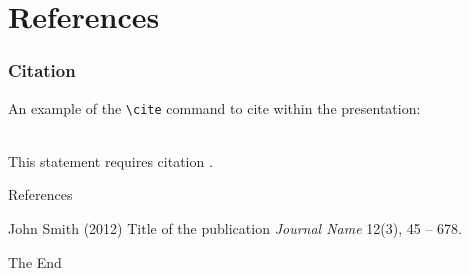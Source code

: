 \documentclass[aspectratio=169,xcolor=dvipsnames]{beamer}
\begin{document}

\section{References}


\begin{frame}[fragile] %
    \frametitle{Citation}
    An example of the \verb|\cite| command to cite within the presentation:\\~

    This statement requires citation \cite{p1}.
\end{frame}


\begin{frame}{References}
    \footnotesize{
        \begin{thebibliography}{99}
             John Smith (2012)
            \newblock Title of the publication
            \newblock \emph{Journal Name} 12(3), 45 -- 678.
        \end{thebibliography}
    }
\end{frame}


\begin{frame}
    \Huge{\centerline{The End}}
\end{frame}

\end{document}
